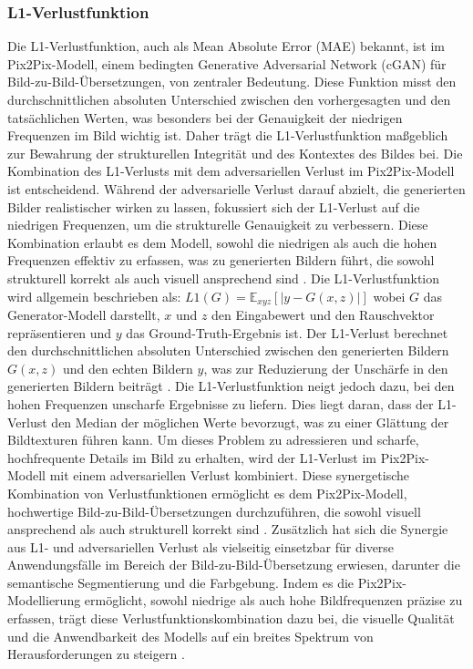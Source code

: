 \subsubsection{L1-Verlustfunktion}

Die L1-Verlustfunktion, auch als Mean Absolute Error (MAE) bekannt, ist im Pix2Pix-Modell, einem bedingten Generative Adversarial Network (cGAN) für Bild-zu-Bild-Übersetzungen, von zentraler Bedeutung. Diese Funktion misst den durchschnittlichen absoluten Unterschied zwischen den vorhergesagten und den tatsächlichen Werten, was besonders bei der Genauigkeit der niedrigen Frequenzen im Bild wichtig ist. Daher trägt die L1-Verlustfunktion maßgeblich zur Bewahrung der strukturellen Integrität und des Kontextes des Bildes bei.
\newline
Die Kombination des L1-Verlusts mit dem adversariellen Verlust im Pix2Pix-Modell ist entscheidend. Während der adversarielle Verlust darauf abzielt, die generierten Bilder realistischer wirken zu lassen, fokussiert sich der L1-Verlust auf die niedrigen Frequenzen, um die strukturelle Genauigkeit zu verbessern. Diese Kombination erlaubt es dem Modell, sowohl die niedrigen als auch die hohen Frequenzen effektiv zu erfassen, was zu generierten Bildern führt, die sowohl strukturell korrekt als auch visuell ansprechend sind \cite{PhillipIsola.}.
\newline
Die L1-Verlustfunktion wird allgemein beschrieben als:
$L1(G) = \mathbb{E}_{xyz} \left[ \left| y - G(x, z) \right| \right]$
wobei $G$ das Generator-Modell darstellt, $x$ und $z$ den Eingabewert und den Rauschvektor repräsentieren und $y$ das Ground-Truth-Ergebnis ist. Der L1-Verlust berechnet den durchschnittlichen absoluten Unterschied zwischen den generierten Bildern $G(x,z)$ und den echten Bildern $y$, was zur Reduzierung der Unschärfe in den generierten Bildern beiträgt \cite{PhillipIsola.}.
\newline
Die L1-Verlustfunktion neigt jedoch dazu, bei den hohen Frequenzen unscharfe Ergebnisse zu liefern. Dies liegt daran, dass der L1-Verlust den Median der möglichen Werte bevorzugt, was zu einer Glättung der Bildtexturen führen kann. Um dieses Problem zu adressieren und scharfe, hochfrequente Details im Bild zu erhalten, wird der L1-Verlust im Pix2Pix-Modell mit einem adversariellen Verlust kombiniert. Diese synergetische Kombination von Verlustfunktionen ermöglicht es dem Pix2Pix-Modell, hochwertige Bild-zu-Bild-Übersetzungen durchzuführen, die sowohl visuell ansprechend als auch strukturell korrekt sind \cite{PhillipIsola.}. \newline
Zusätzlich hat sich die Synergie aus L1- und adversariellen Verlust als vielseitig einsetzbar für diverse Anwendungsfälle im Bereich der Bild-zu-Bild-Übersetzung erwiesen, darunter die semantische Segmentierung und die Farbgebung. Indem es die Pix2Pix-Modellierung ermöglicht, sowohl niedrige als auch hohe Bildfrequenzen präzise zu erfassen, trägt diese Verlustfunktionskombination dazu bei, die visuelle Qualität und die Anwendbarkeit des Modells auf ein breites Spektrum von Herausforderungen zu steigern \cite{PhillipIsola.}.


